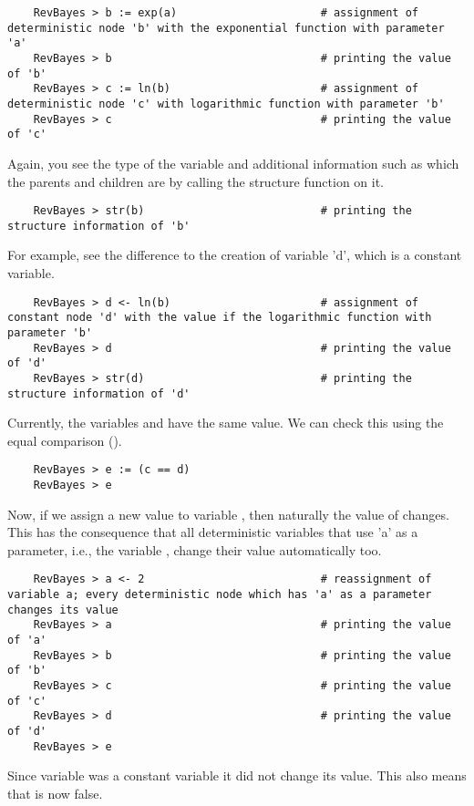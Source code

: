 {\tt \begin{snugshade*}
\begin{lstlisting}    
    RevBayes > b := exp(a)                      # assignment of deterministic node 'b' with the exponential function with parameter 'a'
    RevBayes > b                                # printing the value of 'b'
    RevBayes > c := ln(b)                       # assignment of deterministic node 'c' with logarithmic function with parameter 'b'
    RevBayes > c                                # printing the value of 'c'
\end{lstlisting}
\end{snugshade*}}
Again, you see the type of the variable and additional information such as which the parents and children are by calling the structure function on it.
{\tt \begin{snugshade*}
\begin{lstlisting}    
    RevBayes > str(b)                           # printing the structure information of 'b'
\end{lstlisting}
\end{snugshade*}}
For example, see the difference to the creation of variable 'd', which is a constant variable.
{\tt \begin{snugshade*}
\begin{lstlisting}    
    RevBayes > d <- ln(b)                       # assignment of constant node 'd' with the value if the logarithmic function with parameter 'b'
    RevBayes > d                                # printing the value of 'd'
    RevBayes > str(d)                           # printing the structure information of 'd'
\end{lstlisting}
\end{snugshade*}}
Currently, the variables  and  have the same value. 
We can check this using the equal comparison (\cl{==}).
{\tt \begin{snugshade*}
\begin{lstlisting}    
    RevBayes > e := (c == d)			
    RevBayes > e
\end{lstlisting}
\end{snugshade*}}
Now, if we assign a new value to variable , then naturally the value of  changes. 
This has the consequence that all deterministic variables that use 'a' as a parameter, i.e., the variable , change their value automatically too.
{\tt \begin{snugshade*}
\begin{lstlisting}    
    RevBayes > a <- 2                           # reassignment of variable a; every deterministic node which has 'a' as a parameter changes its value
    RevBayes > a                                # printing the value of 'a'
    RevBayes > b                                # printing the value of 'b'
    RevBayes > c                                # printing the value of 'c'
    RevBayes > d                                # printing the value of 'd'
    RevBayes > e
\end{lstlisting}
\end{snugshade*}}
Since variable  was a constant variable it did not change its value. 
This also means that  is now false.

